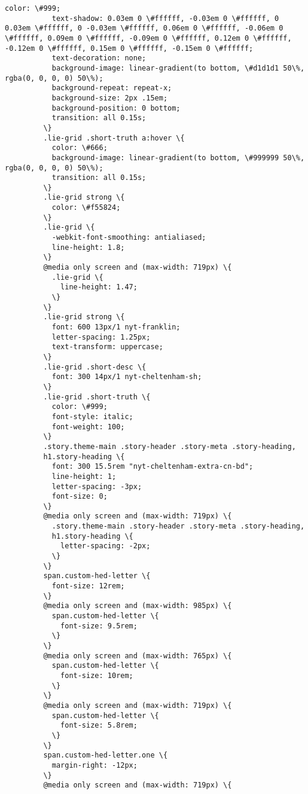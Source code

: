 \documentclass[11pt]{article}
\begin{document}
\begin{Verbatim}[commandchars=\\\{\}]
           color: \#999;
           text-shadow: 0.03em 0 \#ffffff, -0.03em 0 \#ffffff, 0 0.03em \#ffffff, 0 -0.03em \#ffffff, 0.06em 0 \#ffffff, -0.06em 0 \#ffffff, 0.09em 0 \#ffffff, -0.09em 0 \#ffffff, 0.12em 0 \#ffffff, -0.12em 0 \#ffffff, 0.15em 0 \#ffffff, -0.15em 0 \#ffffff;
           text-decoration: none;
           background-image: linear-gradient(to bottom, \#d1d1d1 50\%, rgba(0, 0, 0, 0) 50\%);
           background-repeat: repeat-x;
           background-size: 2px .15em;
           background-position: 0 bottom;
           transition: all 0.15s;
         \}
         .lie-grid .short-truth a:hover \{
           color: \#666;
           background-image: linear-gradient(to bottom, \#999999 50\%, rgba(0, 0, 0, 0) 50\%);
           transition: all 0.15s;
         \}
         .lie-grid strong \{
           color: \#f55824;
         \}
         .lie-grid \{
           -webkit-font-smoothing: antialiased;
           line-height: 1.8;
         \}
         @media only screen and (max-width: 719px) \{
           .lie-grid \{
             line-height: 1.47;
           \}
         \}
         .lie-grid strong \{
           font: 600 13px/1 nyt-franklin;
           letter-spacing: 1.25px;
           text-transform: uppercase;
         \}
         .lie-grid .short-desc \{
           font: 300 14px/1 nyt-cheltenham-sh;
         \}
         .lie-grid .short-truth \{
           color: \#999;
           font-style: italic;
           font-weight: 100;
         \}
         .story.theme-main .story-header .story-meta .story-heading,
         h1.story-heading \{
           font: 300 15.5rem "nyt-cheltenham-extra-cn-bd";
           line-height: 1;
           letter-spacing: -3px;
           font-size: 0;
         \}
         @media only screen and (max-width: 719px) \{
           .story.theme-main .story-header .story-meta .story-heading,
           h1.story-heading \{
             letter-spacing: -2px;
           \}
         \}
         span.custom-hed-letter \{
           font-size: 12rem;
         \}
         @media only screen and (max-width: 985px) \{
           span.custom-hed-letter \{
             font-size: 9.5rem;
           \}
         \}
         @media only screen and (max-width: 765px) \{
           span.custom-hed-letter \{
             font-size: 10rem;
           \}
         \}
         @media only screen and (max-width: 719px) \{
           span.custom-hed-letter \{
             font-size: 5.8rem;
           \}
         \}
         span.custom-hed-letter.one \{
           margin-right: -12px;
         \}
         @media only screen and (max-width: 719px) \{

\end{Verbatim}
\end{document}
